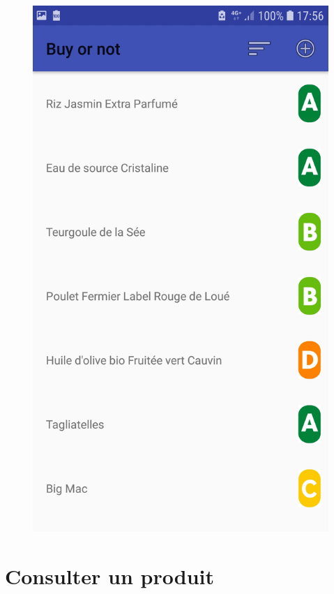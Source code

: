 \documentclass[report]{BetterDocument}
\begin{document}
	\begin{figure}[H]
		\centering\includegraphics[width=0.5\paperwidth, height=0.3\paperheight, keepaspectratio]{img/lister_nova_nutriscore.jpg}
	\end{figure}

	\section{Consulter un produit}
\end{document}
